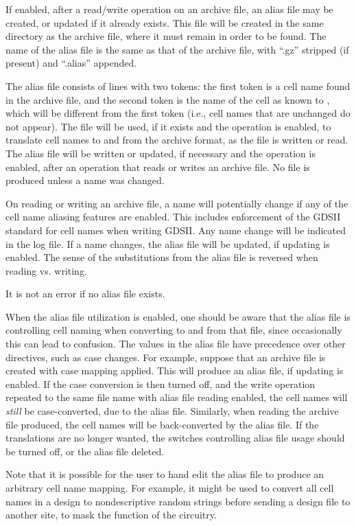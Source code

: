 If enabled, after a read/write operation on an archive file, an alias
file may be created, or updated if it already exists.  This file will
be created in the same directory as the archive file, where it must
remain in order to be found.  The name of the alias file is the same
as that of the archive file, with ``{\vt .gz}'' stripped (if present)
and ``{\vt .alias}'' appended.

The alias file consists of lines with two tokens:  the first token is
a cell name found in the archive file, and the second token is the
name of the cell as known to {\Xic}, which will be different from the
first token (i.e., cell names that are unchanged do not appear).  The
file will be used, if it exists and the operation is enabled, to
translate cell names to and from the archive format, as the file is
written or read.  The alias file will be written or updated, if
necessary and the operation is enabled, after an operation that reads
or writes an archive file.  No file is produced unless a name was
changed.

On reading or writing an archive file, a name will potentially change
if any of the cell name aliasing features are enabled.  This includes
enforcement of the GDSII standard for cell names when writing GDSII. 
Any name change will be indicated in the log file.  If a name changes,
the alias file will be updated, if updating is enabled.  The sense of
the substitutions from the alias file is reversed when reading vs. 
writing.

It is not an error if no alias file exists.

When the alias file utilization is enabled, one should be aware that
the alias file is controlling cell naming when converting to and from
that file, since occasionally this can lead to confusion.  The values
in the alias file have precedence over other directives, such as case
changes.  For example, suppose that an archive file is created with
case mapping applied.  This will produce an alias file, if updating is
enabled.  If the case conversion is then turned off, and the write
operation repeated to the same file name with alias file reading
enabled, the cell names will {\it still} be case-converted, due to
the alias file.  Similarly, when reading the archive file produced,
the cell names will be back-converted by the alias file.  If the
translations are no longer wanted, the switches controlling alias file
usage should be turned off, or the alias file deleted.

Note that it is possible for the user to hand edit the alias file to
produce an arbitrary cell name mapping.  For example, it might be used
to convert all cell names in a design to nondescriptive random strings
before sending a design file to another site, to mask the function of
the circuitry.



